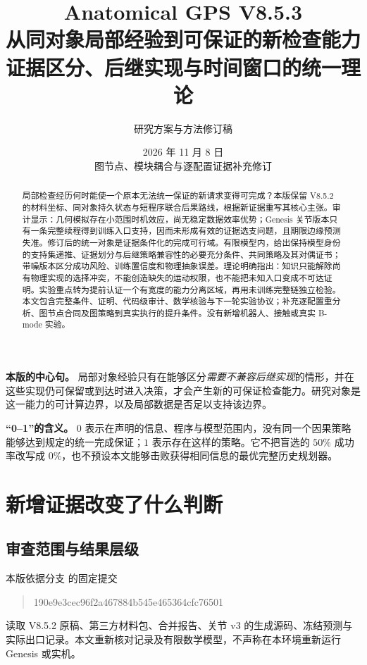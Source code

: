 \documentclass[11pt,a4paper,fontset=fandol]{ctexart}
\title{\color{ink}\bfseries Anatomical GPS V8.5.3\\[.35em]
\LARGE 从同对象局部经验到可保证的新检查能力\\[.4em]
\large 证据区分、后继实现与时间窗口的统一理论}
\author{研究方案与方法修订稿}
\date{2026 年 11 月 8 日\\[.2em]\small 图节点、模块耦合与逐配置证据补充修订}
\theoremstyle{definition}
\theoremstyle{remark}\newtheorem{remark}[theorem]{说明}
\numberwithin{equation}{section}
\begin{document}
\maketitle
\begin{abstract}
局部检查经历何时能使一个原本无法统一保证的新请求变得可完成？本版保留 V8.5.2 的材料坐标、同对象持久状态与短程序联合后果路线，根据新证据重写其核心主张。审计显示：几何模拟存在小范围时机效应，尚无稳定数据效率优势；Genesis 关节版本只有一条完整续程得到训练入口支持，因而未形成有效的证据选支问题，且期限边缘预测失准。修订后的统一对象是证据条件化的完成可行域。有限模型内，给出保持模型身份的支持集递推、证据划分与后继策略兼容性的必要充分条件、共同策略及其对偶证书；带噪版本区分成功风险、训练置信度和物理抽象误差。理论明确指出：知识只能解除尚有物理实现的选择冲突，不能创造缺失的运动权限，也不能把未知入口变成不可达证明。实验重点转为提前认证一个有宽度的能力分离区域，再用未训练完整链独立检验。本文包含完整条件、证明、代码级审计、数学核验与下一轮实验协议；补充逐配置重分析、图节点合同及图策略到真实执行的提升条件。没有新增机器人、接触或真实 B-mode 实验。
\end{abstract}

\begin{corebox}
\textbf{本版的中心句。}
局部对象经验只有在能够区分\emph{需要不兼容后继实现}的情形，并在这些实现仍可保留或到达时进入决策，才会产生新的可保证检查能力。研究对象是这一能力的可计算边界，以及局部数据是否足以支持该边界。

\textbf{“0--1”的含义。} $0$ 表示在声明的信息、程序与模型范围内，没有同一个因果策略能够达到规定的统一完成保证；$1$ 表示存在这样的策略。它不把盲选的 $50\%$ 成功率改写成 $0\%$，也不预设本文能够击败获得相同信息的最优完整历史规划器。
\end{corebox}

\clearpage
\tableofcontents
\clearpage

\section{新增证据改变了什么判断}
\label{sec:audit}
\subsection{审查范围与结果层级}
本版依据分支  的固定提交
\begin{quote}\small\ttfamily
190e9e3cec96f2a467884b545e465364cfc76501
\end{quote}
读取 V8.5.2 原稿、第三方材料包、合并报告、关节 v3 的生成源码、冻结预测与实际出口记录\cite{v852,evidence,results,jointcode,jointdata}。本文重新核对记录及有限数学模型，不声称在本环境重新运行 Genesis 或实机。
\end{document}
